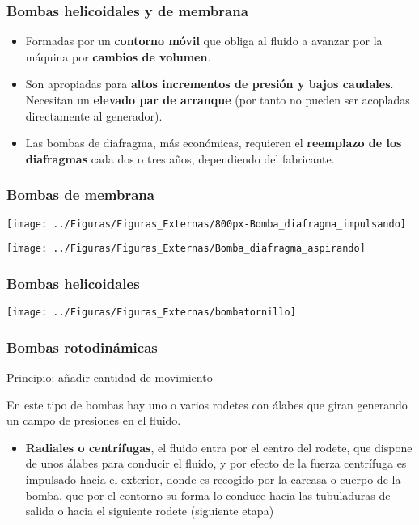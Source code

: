 \documentclass[serif, xcolor=dvipsnames]{beamer}
\begin{document}
\begin{frame}
\frametitle{Bombas helicoidales y de membrana}
\begin{itemize}
\item Formadas por un \textbf{contorno móvil} que obliga al fluido a avanzar
por la máquina por \textbf{cambios de volumen}.
\item Son apropiadas para \textbf{altos incrementos de presión y bajos caudales}.
Necesitan un \textbf{elevado par de arranque} (por tanto no pueden
ser acopladas directamente al generador).
\item Las bombas de diafragma, más económicas, requieren el \textbf{reemplazo
de los diafragmas} cada dos o tres años, dependiendo del fabricante.
\end{itemize}

\end{frame}

\begin{frame}
\frametitle{Bombas de membrana}

\begin{center}
\texttt{[image: ../Figuras/Figuras\_Externas/800px-Bomba\_diafragma\_impulsando]}
\par\end{center}

\begin{center}
\texttt{[image: ../Figuras/Figuras\_Externas/Bomba\_diafragma\_aspirando]}
\par\end{center}


\end{frame}

\begin{frame}
\frametitle{Bombas helicoidales}

\begin{center}
\texttt{[image: ../Figuras/Figuras\_Externas/bombatornillo]}
\par\end{center}


\end{frame}

\begin{frame}
\frametitle{Bombas rotodinámicas}
\begin{block}
{Principio: añadir cantidad de movimiento} 

En este tipo de bombas hay uno o varios rodetes con álabes que giran
generando un campo de presiones en el fluido. 
\begin{itemize}
\item \textbf{Radiales o centrífugas}, el fluido entra por el centro del
rodete, que dispone de unos álabes para conducir el fluido, y por
efecto de la fuerza centrífuga es impulsado hacia el exterior, donde
es recogido por la carcasa o cuerpo de la bomba, que por el contorno
su forma lo conduce hacia las tubuladuras de salida o hacia el siguiente
rodete (siguiente etapa)
\end{itemize}
\end{block}

\end{frame}
\end{document}
